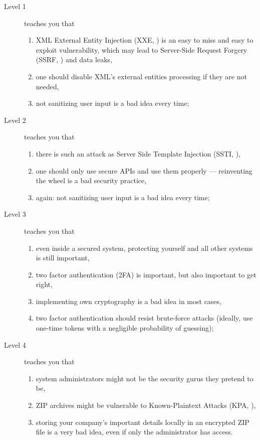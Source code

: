 \documentclass[11pt, a4paper]{article}
\begin{document}
\begin{description}
  \item[Level 1] teaches you that
        \begin{enumerate}
          \item XML External Entity Injection (XXE, \citep{xxe}) is an easy to miss and easy to exploit vulnerability, which may lead to Server-Side Request Forgery (SSRF, \citep{ssrf}) and data leaks,
          \item one should disable XML's external entities processing if they are not needed,
          \item not sanitizing user input is a bad idea every time;
        \end{enumerate}

  \item[Level 2] teaches you that
        \begin{enumerate}
          \item there is such an attack as Server Side Template Injection (SSTI, \citep{ssti}),
          \item one should only use secure APIs and use them properly --- reinventing the wheel is a bad security practice,
          \item again: not sanitizing user input is a bad idea every time;
        \end{enumerate}

  \item[Level 3] teaches you that
        \begin{enumerate}
          \item even inside a secured system, protecting yourself and all other systems
                is still important,
          \item two factor authentication (2FA) is important, but also important to get right,
          \item implementing own cryptography is a bad idea in most cases,
          \item two factor authentication should resist brute-force attacks (ideally, use one-time tokens with a negligible probability of guessing);
        \end{enumerate}

  \item[Level 4] teaches you that
        \begin{enumerate}
          \item system administrators might not be the security gurus they pretend to be,
          \item ZIP archives might be vulnerable to Known-Plaintext Attacks (KPA, \citep{kpa}),
          \item storing your company's important details locally in an encrypted ZIP
                file is a very bad idea, even if only the administrator has access.
        \end{enumerate}
\end{description}
\end{document}
